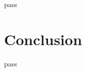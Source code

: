 \documentclass[letterpaper,twocolumn,10pt]{article}
\begin{document}
pass

\section{Conclusion}

pass


% 

\end{document}
